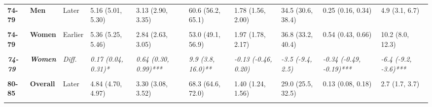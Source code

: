 \begin{table}[!h]
{{\begin{tabular}[t]{>{}l>{}lllllllll}
\cmidrule{1-10}
\textbf{74-79} & \textbf{Men} & Later & 5.16 (5.01, 5.30) & 3.13 (2.90, 3.35) & 60.6 (56.2, 65.1) & 1.78 (1.56, 2.00) & 34.5 (30.6, 38.4) & 0.25 (0.16, 0.34) & 4.9 (3.1, 6.7)\\
\cmidrule{1-10}
\em{\textbf{\cellcolor{gray!10}{74-79}}} & \em{\textbf{\cellcolor{gray!10}{Men}}} & \em{\cellcolor{gray!10}{Diff.}} & \em{\cellcolor{gray!10}{-0.07 (-0.25, 0.12)}} & \em{\cellcolor{gray!10}{0.10 (-0.21, 0.40)}} & \em{\cellcolor{gray!10}{2.6 (-3.2, 8.3)}} & \em{\cellcolor{gray!10}{-0.11 (-0.39, 0.17)}} & \em{\cellcolor{gray!10}{-1.7 (-6.8, 3.5)}} & \em{\cellcolor{gray!10}{-0.05 (-0.18, 0.07)}} & \em{\cellcolor{gray!10}{-0.9 (-3.4, 1.5)}}\\
\cmidrule{1-10}
\textbf{74-79} & \textbf{Women} & Earlier & 5.36 (5.25, 5.46) & 2.84 (2.63, 3.05) & 53.0 (49.1, 56.9) & 1.97 (1.78, 2.17) & 36.8 (33.2, 40.4) & 0.54 (0.43, 0.66) & 10.2 (8.0, 12.3)\\
\cmidrule{1-10}
\textbf{\cellcolor{gray!10}{74-79}} & \textbf{\cellcolor{gray!10}{Women}} & \cellcolor{gray!10}{Later} & \cellcolor{gray!10}{5.53 (5.44, 5.62)} & \cellcolor{gray!10}{3.48 (3.21, 3.75)} & \cellcolor{gray!10}{62.9 (58.2, 67.6)} & \cellcolor{gray!10}{1.85 (1.59, 2.11)} & \cellcolor{gray!10}{33.3 (28.6, 38.1)} & \cellcolor{gray!10}{0.21 (0.11, 0.31)} & \cellcolor{gray!10}{3.7 (1.9, 5.5)}\\
\cmidrule{1-10}
\em{\textbf{74-79}} & \em{\textbf{Women}} & \em{Diff.} & \em{0.17 (0.04, 0.31)*} & \em{0.64 (0.30, 0.99)***} & \em{9.9 (3.8, 16.0)**} & \em{-0.13 (-0.46, 0.20)} & \em{-3.5 (-9.4, 2.5)} & \em{-0.34 (-0.49, -0.19)***} & \em{-6.4 (-9.2, -3.6)***}\\
\cmidrule{1-10}
\textbf{\cellcolor{gray!10}{80-85}} & \textbf{\cellcolor{gray!10}{Overall}} & \cellcolor{gray!10}{Earlier} & \cellcolor{gray!10}{4.74 (4.63, 4.85)} & \cellcolor{gray!10}{2.76 (2.58, 2.93)} & \cellcolor{gray!10}{58.1 (54.8, 61.5)} & \cellcolor{gray!10}{1.48 (1.33, 1.63)} & \cellcolor{gray!10}{31.3 (28.2, 34.3)} & \cellcolor{gray!10}{0.50 (0.41, 0.59)} & \cellcolor{gray!10}{10.6 (8.7, 12.5)}\\
\cmidrule{1-10}
\textbf{80-85} & \textbf{Overall} & Later & 4.84 (4.70, 4.97) & 3.30 (3.08, 3.52) & 68.3 (64.6, 72.0) & 1.40 (1.24, 1.56) & 29.0 (25.5, 32.5) & 0.13 (0.08, 0.18) & 2.7 (1.7, 3.7)\\
\cmidrule{1-10}
\em{\textbf{\cellcolor{gray!10}{80-85}}} & \em{\textbf{\cellcolor{gray!10}{Overall}}} & \em{\cellcolor{gray!10}{Diff.}} & \em{\cellcolor{gray!10}{0.09 (-0.07, 0.26)}} & \em{\cellcolor{gray!10}{0.55 (0.27, 0.83)***}} & \em{\cellcolor{gray!10}{10.2 (5.2, 15.1)***}} & \em{\cellcolor{gray!10}{-0.08 (-0.30, 0.14)}} & \em{\cellcolor{gray!10}{-2.3 (-6.9, 2.4)}} & \em{\cellcolor{gray!10}{-0.37 (-0.47, -0.27)***}} & \em{\cellcolor{gray!10}{-7.9 (-10.1, -5.7)***}}\\

\end{tabular}}}
\end{table}
